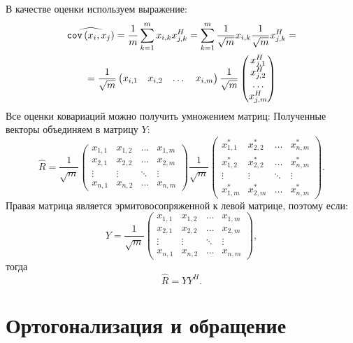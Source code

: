 В качестве оценки используем выражение:
\begin{multline*}
    \widehat{\mathtt{cov} \left ( x_i, x_j \right )}
    = \frac{1}{m} \sum_{k=1}^m x_{i,k} x_{j,k}^H
    = \sum_{k=1}^m \frac{1}{\sqrt{m}}x_{i,k} \frac{1}{\sqrt{m}} x_{j,k}^H = \\
    = \frac{1}{\sqrt{m}}
    \begin{pmatrix}
        x_{i,1} & x_{i,2} & \dots & x_{i,m}
    \end{pmatrix}
    \frac{1}{\sqrt{m}}
    \begin{pmatrix}
        x_{j,1}^H \\
        x_{j,2}^H \\
        \dots     \\
        x_{j,m}^H
    \end{pmatrix}
\end{multline*}
Все оценки ковариаций можно получить умножением матриц:
Полученные векторы объединяем в матрицу $Y$:
\[
    \widehat{R} =
    \frac{1}{\sqrt{m}}
    \begin{pmatrix}
        x_{1,1} & x_{1,2} & \dots  & x_{1,m} \\
        x_{2,1} & x_{2,2} & \dots  & x_{2,m} \\
        \vdots  & \vdots  & \ddots & \vdots  \\
        x_{n,1} & x_{n,2} & \dots  & x_{n,m}
    \end{pmatrix}
    \frac{1}{\sqrt{m}}
    \begin{pmatrix}
        x_{1,1}^* & x_{2,2}^* & \dots  & x_{n,m}^* \\
        x_{1,2}^* & x_{2,2}^* & \dots  & x_{n,m}^* \\
        \vdots    & \vdots    & \ddots & \vdots    \\
        x_{1,m}^* & x_{2,m}^* & \dots  & x_{n,m}^*
    \end{pmatrix}
    .
\]
Правая матрица является эрмитовосопряженной к левой матрице, поэтому если:
\[
    Y =
    \frac{1}{\sqrt{m}}
    \begin{pmatrix}
        x_{1,1} & x_{1,2} & \dots  & x_{1,m} \\
        x_{2,1} & x_{2,2} & \dots  & x_{2,m} \\
        \vdots  & \vdots  & \ddots & \vdots  \\
        x_{n,1} & x_{n,2} & \dots  & x_{n,m}
    \end{pmatrix} ,
\]
тогда
\[
    \widehat{R} = Y Y^H .
\]


\section{Ортогонализация и обращение}

